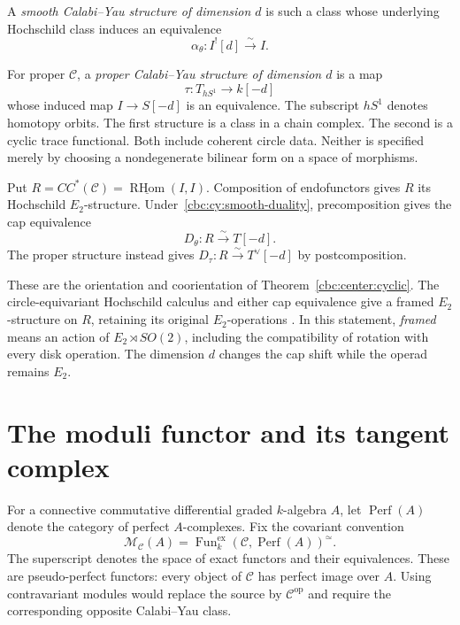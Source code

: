 A \emph{smooth Calabi--Yau structure of dimension $d$} is such a class whose underlying Hochschild class induces an equivalence
\begin{equation}\label{cbc:cy:smooth-duality}
 \alpha_\theta:I^![d]\xrightarrow{\sim}I.
\end{equation}

For proper $\mathcal C$, a \emph{proper Calabi--Yau structure of dimension $d$} is a map
\[
 \tau:T_{hS^1}\longrightarrow k[-d]
\]
whose induced map $I\to S[-d]$ is an equivalence.
The subscript $hS^1$ denotes homotopy orbits.
The first structure is a class in a chain complex.
The second is a cyclic trace functional.
Both include coherent circle data.
Neither is specified merely by choosing a nondegenerate bilinear form on a space of morphisms.

Put $R=CC^*(\mathcal C)=\underline{\operatorname{RHom}}(I,I)$.
Composition of endofunctors gives $R$ its Hochschild $E_2$-structure.
Under~\eqref{cbc:cy:smooth-duality}, precomposition gives the cap equivalence
\[
 D_\theta:R\xrightarrow{\sim}T[-d].
\]
The proper structure instead gives $D_\tau:R\xrightarrow{\sim}T^\vee[-d]$ by postcomposition.

These are the orientation and coorientation of Theorem~\ref{cbc:center:cyclic}.
The circle-equivariant Hochschild calculus and either cap equivalence give a framed $E_2$-structure on $R$, retaining its original $E_2$-operations
\cite[Theorems~4.1.7 and 4.3.4]{BravRozenblyum}.
In this statement, \emph{framed} means an action of $E_2\rtimes SO(2)$, including the compatibility of rotation with every disk operation.
The dimension $d$ changes the cap shift while the operad remains $E_2$.

\section{The moduli functor and its tangent complex}

For a connective commutative differential graded $k$-algebra $A$, let $\operatorname{Perf}(A)$ denote the category of perfect $A$-complexes.
Fix the covariant convention
\begin{equation}\label{cbc:cy:moduli}
 \mathcal M_{\mathcal C}(A)=
 \operatorname{Fun}^{\mathrm{ex}}_k
       (\mathcal C,\operatorname{Perf}(A))^{\simeq}.
\end{equation}
The superscript denotes the space of exact functors and their equivalences.
These are pseudo-perfect functors: every object of $\mathcal C$ has perfect image over $A$.
Using contravariant modules would replace the source by $\mathcal C^{\mathrm{op}}$ and require the corresponding opposite Calabi--Yau class.

